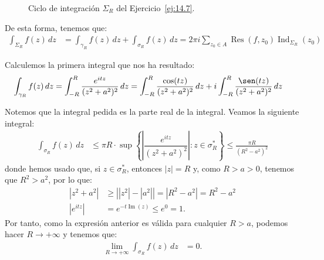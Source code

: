 \documentclass[12pt]{article}
\renewcommand{\Im}{\operatorname{Im}}
\DeclareMathOperator{\Ind}{Ind}
\DeclareMathOperator{\Res}{Res}
\begin{document}
\begin{ejercicio}[2.5 puntos]
\begin{figure}
        \caption{Ciclo de integración $\Sigma_R$ del Ejercicio~\ref{ej:14.7}.}
        \label{fig:ej:14.7}
    \end{figure}

    De esta forma, tenemos que:
    \begin{align*}
        \int_{\Sigma_R} f(z) \, dz &= \int_{\gamma_R} f(z) \, dz + \int_{\sigma_R} f(z) \, dz
        = 2\pi i\sum_{z_0\in A}\Res(f,z_0)\Ind_{\Sigma_R}(z_0)
    \end{align*}

    Calculemos la primera integral que nos ha resultado:
    \begin{align*}
        \int_{\gamma_R} f(z) \, dz &= \int_{-R}^{R} \frac{e^{i t z}}{(z^2 + a^2)^2} \, dz
        = \int_{-R}^{R} \frac{\cos(t z)}{(z^2 + a^2)^2} \, dz
        + i\int_{-R}^{R} \frac{\sen(t z)}{(z^2 + a^2)^2} \, dz
    \end{align*}

    Notemos que la integral pedida es la parte real de la integral. Veamos la siguiente integral:
    \begin{align*}
        \int_{\sigma_R} f(z) \, dz &\leq \pi R\cdot \sup\left\{\left|\dfrac{e^{i t z}}{(z^2 + a^2)^2}\right| : z\in \sigma_R^*\right\}
        \leq \frac{\pi R}{(R^2 - a^2)^2}
    \end{align*}
    donde hemos usado que, si $z\in \sigma_R^*$, entonces $|z|=R$ y, como $R>a>0$, tenemos que $R^2>a^2$, por lo que:
    \begin{align*}
        |z^2 + a^2| &\geq \left||z^2| - |a^2|\right| = \left|R^2 - a^2\right| = R^2 - a^2\\
        |e^{i t z}| &=e^{-t\Im(z)}\leq e^0 = 1.
    \end{align*}
    Por tanto, como la expresión anterior es válida para cualquier $R > a$, podemos hacer $R \to +\infty$ y tenemos que:
    \begin{align*}
        \lim_{R\to+\infty} \int_{\sigma_R} f(z) \, dz &= 0.
    \end{align*}


\end{ejercicio}
\end{document}
